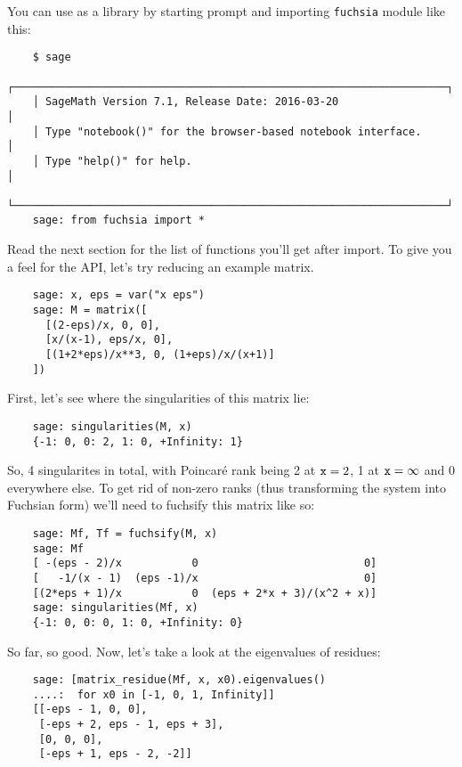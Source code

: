 \documentclass[12pt,a4paper]{article}
\begin{document}
You can use \fuchsia as a library by starting \sage prompt and importing \texttt{fuchsia} module like this:

\begin{verbatim}
    $ sage
    ┌────────────────────────────────────────────────────────────────────┐
    │ SageMath Version 7.1, Release Date: 2016-03-20                     │
    │ Type "notebook()" for the browser-based notebook interface.        │
    │ Type "help()" for help.                                            │
    └────────────────────────────────────────────────────────────────────┘
    sage: from fuchsia import *
\end{verbatim}

Read the next section for the list of functions you'll get after import.
To give you a feel for the API, let's try reducing an example matrix.

\begin{verbatim}
    sage: x, eps = var("x eps")
    sage: M = matrix([
      [(2-eps)/x, 0, 0],
      [x/(x-1), eps/x, 0],
      [(1+2*eps)/x**3, 0, (1+eps)/x/(x+1)]
    ])
\end{verbatim}

First, let's see where the singularities of this matrix lie:

\begin{verbatim}
    sage: singularities(M, x)
    {-1: 0, 0: 2, 1: 0, +Infinity: 1}
\end{verbatim}

So, 4 singularites in total, with Poincar\'e rank being 2 at $\texttt{x}=2$, 1 at $\texttt{x}=\infty$ and 0 everywhere else.
To get rid of non-zero ranks (thus transforming the system into Fuchsian form) we'll need to fuchsify this matrix like so:

\begin{verbatim}
    sage: Mf, Tf = fuchsify(M, x)
    sage: Mf
    [ -(eps - 2)/x           0                          0]
    [   -1/(x - 1)  (eps -1)/x                          0]
    [(2*eps + 1)/x           0  (eps + 2*x + 3)/(x^2 + x)]
    sage: singularities(Mf, x)
    {-1: 0, 0: 0, 1: 0, +Infinity: 0}
\end{verbatim}

So far, so good. Now, let's take a look at the eigenvalues of  residues:

\begin{verbatim}
    sage: [matrix_residue(Mf, x, x0).eigenvalues()
    ....:  for x0 in [-1, 0, 1, Infinity]]
    [[-eps - 1, 0, 0],
     [-eps + 2, eps - 1, eps + 3],
     [0, 0, 0],
     [-eps + 1, eps - 2, -2]]
\end{verbatim}
\end{document}
